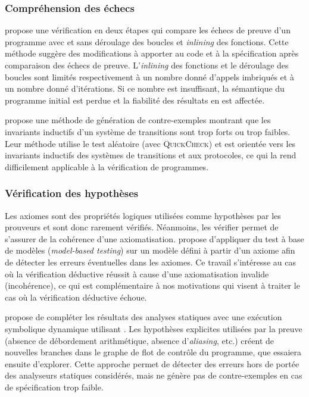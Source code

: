 \subsubsection*{Compréhension des échecs}


\cite{Tschannen/14} propose une vérification en deux étapes qui compare les
échecs de preuve d'un programme \eiffel avec et sans déroulage des boucles et
{\em inlining} des fonctions.
Cette méthode suggère des modifications à apporter au code et à la spécification
après comparaison des échecs de preuve.
L'{\em inlining} des fonctions et le déroulage des boucles sont limités
respectivement à un nombre donné d'appels imbriqués et à un nombre donné
d'itérations.
Si ce nombre est insuffisant, la sémantique du programme initial est perdue et
la fiabilité des résultats en est affectée.

\cite{Claessen/TAP08} propose une méthode de génération de contre-exemples
montrant que les invariants inductifs d'un système de transitions sont trop
forts ou trop faibles.
Leur méthode utilise le test aléatoire (avec \textsc{QuickCheck}) et est
orientée vers les invariants inductifs des systèmes de transitions et aux
protocoles, ce qui la rend difficilement applicable à la vérification de
programmes.


\subsubsection*{Vérification des hypothèses}


Les axiomes sont des propriétés logiques utilisées comme hypothèses par les
prouveurs et sont donc rarement vérifiés.
Néanmoins, les vérifier permet de s'assurer de la cohérence d'une
axiomatisation.
\cite{Ahn/TAP10} propose d'appliquer du test à base de modèles
({\em model-based testing}) sur un modèle défini à partir d'un axiome afin de
détecter les erreurs éventuelles dans les axiomes.
Ce travail s'intéresse au cas où la vérification déductive réussit à cause
d'une axiomatisation invalide (incohérence), ce qui est complémentaire à nos
motivations qui visent à traiter le cas où la vérification déductive échoue.

\cite{Christakis/FM12} propose de compléter les résultats des analyses statiques
avec une exécution symbolique dynamique utilisant \pex.
Les hypothèses explicites utilisées par la preuve (absence de
débordement arithmétique, absence d'{\em aliasing}, etc.) créent de nouvelles
branches dans le graphe de flot de contrôle du programme, que \pex essaiera
ensuite d'explorer.
Cette approche permet de détecter des erreurs hors de portée des analyseurs
statiques considérés, mais ne génère pas de contre-exemples en cas de
spécification trop faible.


